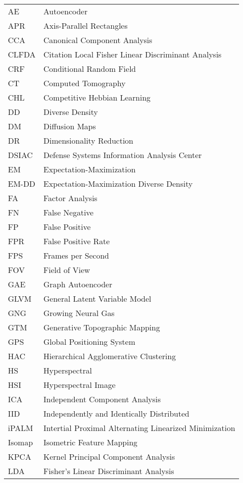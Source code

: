 \begin{longtable}{l p{5in}} %

AE & Autoencoder\\
APR & Axis-Parallel Rectangles\\
CCA & Canonical Component Analysis\\
CLFDA &  Citation Local Fisher Linear Discriminant Analysis\\
CRF & Conditional Random Field\\
CT & Computed Tomography\\
CHL & Competitive Hebbian Learning\\
DD & Diverse Density\\
DM & Diffusion Maps\\
DR & Dimensionality Reduction\\
DSIAC & Defense Systems Information Analysis Center\\
EM & Expectation-Maximization\\
EM-DD & Expectation-Maximization Diverse Density\\
FA & Factor Analysis\\
FN & False Negative\\
FP & False Positive\\ 
FPR & False Positive Rate\\
FPS & Frames per Second\\
FOV & Field of View\\
GAE & Graph Autoencoder\\
GLVM & General Latent Variable Model\\
GNG & Growing Neural Gas\\
GTM & Generative Topographic Mapping\\
GPS & Global Positioning System\\
HAC & Hierarchical Agglomerative Clustering\\
HS & Hyperspectral\\
HSI & Hyperspectral Image\\
ICA & Independent Component Analysis\\
IID & Independently and Identically Distributed\\
iPALM & Intertial Proximal Alternating Linearized Minimization\\
Isomap & Isometric Feature Mapping\\
KPCA & Kernel Principal Component Analysis\\
LDA & Fisher's Linear Discriminant Analysis\\

\end{longtable}
